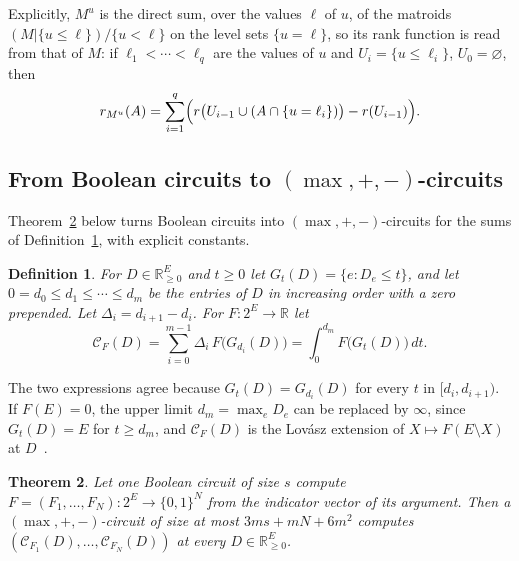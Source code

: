 \documentclass[11pt]{article}
\newtheorem{theorem}{Theorem}[section]
\newtheorem{definition}[theorem]{Definition}
\newcommand{\R}{\mathbb R}
\newcommand{\CC}{\mathcal C}
\begin{document}
Explicitly, $M^{u}$ is the direct sum, over the values $\ell$ of $u$, of the
matroids $(M|\{u\le\ell\})/\{u<\ell\}$ on the level sets $\{u=\ell\}$, so its
rank function is read from that of $M$: if $\ell_1<\cdots<\ell_q$ are the values
of $u$ and $U_i=\{u\le\ell_i\}$, $U_0=\varnothing$, then
\begin{equation}
  r_{M^{u}}(A)=\sum_{i=1}^{q}\Bigl(r\bigl(U_{i-1}\cup(A\cap\{u=\ell_i\})\bigr)-r(U_{i-1})\Bigr).
  \label{eq:rank-mu}
\end{equation}

\subsection{From Boolean circuits to \texorpdfstring{$(\max,+,-)$}{(max,+,-)}-circuits}

Theorem~\ref{thm:compiler} below turns Boolean circuits into
$(\max,+,-)$-circuits for the sums of Definition~\ref{def:ti}, with explicit
constants.

\begin{definition}
\label{def:ti}
For $D\in\R^{E}_{\ge0}$ and $t\ge0$ let $G_t(D)=\{e:D_e\le t\}$, and let
$0=d_0\le d_1\le\cdots\le d_m$ be the entries of $D$ in increasing order with a
zero prepended.  Let $\Delta_i=d_{i+1}-d_i$.  For
$F:2^{E}\to\R$ let
\[
  \CC_F(D)=\sum_{i=0}^{m-1}\Delta_i\,F\bigl(G_{d_i}(D)\bigr)
  =\int_0^{d_m}F\bigl(G_t(D)\bigr)\,dt.
\]
\end{definition}

The two expressions agree because $G_t(D)=G_{d_i}(D)$ for every $t$ in
$[d_i,d_{i+1})$.  If $F(E)=0$, the upper limit $d_m=\max_eD_e$ can be replaced
by $\infty$, since $G_t(D)=E$ for $t\ge d_m$, and $\CC_F(D)$ is the Lov\'asz
extension of $X\mapsto F(E\setminus X)$ at $D$~\cite{lovasz83}.

\begin{theorem}
\label{thm:compiler}
Let one Boolean circuit of size $s$ compute $F=(F_1,\ldots,F_N):2^{E}\to\{0,1\}^{N}$
from the indicator vector of its argument.  Then a $(\max,+,-)$-circuit of
size at most $3ms+mN+6m^{2}$ computes $(\CC_{F_1}(D),\ldots,\CC_{F_N}(D))$ at
every $D\in\R^{E}_{\ge0}$.
\end{theorem}
\end{document}
